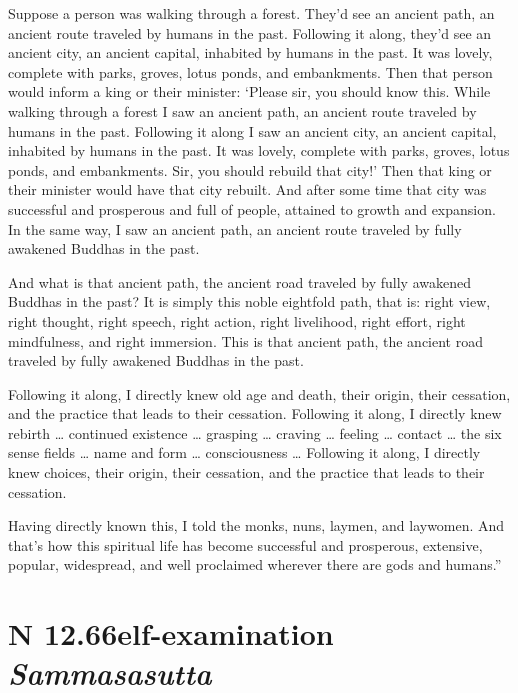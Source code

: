 \documentclass[12pt,openany]{book}%
\newcommand*{\suttatitleacronym}[1]{\smaller[2]{#1}\vspace*{.3em}}
\newcommand*{\suttatitletranslation}[1]{\linebreak{#1}}
\newcommand*{\suttatitleroot}[1]{\linebreak\smaller[2]\itshape{#1}}
\newcommand*{\tocacronym}[1]{\hspace*{-3.3em}{#1}\quad}
\newcommand*{\toctranslation}[1]{#1}
\newcommand*{\tocroot}[1]{(\textit{#1})}
\begin{document}
Suppose a person was walking through a forest. They’d see an ancient path, an ancient route traveled by humans in the past. Following it along, they’d see an ancient city, an ancient capital, inhabited by humans in the past. It was lovely, complete with parks, groves, lotus ponds, and embankments. Then that person would inform a king or their minister: ‘Please sir, you should know this. While walking through a forest I saw an ancient path, an ancient route traveled by humans in the past. Following it along I saw an ancient city, an ancient capital, inhabited by humans in the past. It was lovely, complete with parks, groves, lotus ponds, and embankments. Sir, you should rebuild that city!’ Then that king or their minister would have that city rebuilt. And after some time that city was successful and prosperous and full of people, attained to growth and expansion. In the same way, I saw an ancient path, an ancient route traveled by fully awakened Buddhas in the past. 

And what is that ancient path, the ancient road traveled by fully awakened Buddhas in the past? It is simply this noble eightfold path, that is: right view, right thought, right speech, right action, right livelihood, right effort, right mindfulness, and right immersion. This is that ancient path, the ancient road traveled by fully awakened Buddhas in the past. 

Following it along, I directly knew old age and death, their origin, their cessation, and the practice that leads to their cessation. Following it along, I directly knew rebirth … continued existence … grasping … craving … feeling … contact … the six sense fields … name and form … consciousness … Following it along, I directly knew choices, their origin, their cessation, and the practice that leads to their cessation. 

Having directly known this, I told the monks, nuns, laymen, and laywomen. And that’s how this spiritual life has become successful and prosperous, extensive, popular, widespread, and well proclaimed wherever there are gods and humans.” 

%
\section*{{\suttatitleacronym SN 12.66}{\suttatitletranslation Self-examination }{\suttatitleroot Sammasasutta}}
\addcontentsline{toc}{section}{\tocacronym{SN 12.66} \toctranslation{Self-examination } \tocroot{Sammasasutta}}
\end{document}
